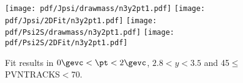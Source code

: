 \begin{figure}[H]
\begin{center}
\texttt{[image: pdf/Jpsi/drawmass/n3y2pt1.pdf]}
\texttt{[image: pdf/Jpsi/2DFit/n3y2pt1.pdf]}
\vspace*{-0.5cm}
\texttt{[image: pdf/Psi2S/drawmass/n3y2pt1.pdf]}
\texttt{[image: pdf/Psi2S/2DFit/n3y2pt1.pdf]}
\vspace*{-0.5cm}
\end{center}
\caption{Fit results in $0\gevc<\pt<2\gevc$, $2.8<y<3.5$ and 45$\leq$PVNTRACKS$<$70.}
\label{Fitn3y2pt1}
\end{figure}
